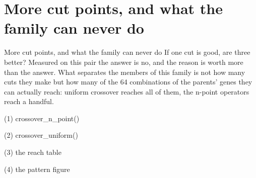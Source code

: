 

\section{More cut points, and what the family can never do}

\begin{frame}{More cut points, and what the family can never do}
If one cut is good, are three better? Measured on this pair the answer is no,
and the reason is worth more than the answer. What separates the members of this
family is not how many cuts they make but how many of the 64 combinations of the
parents' genes they can actually reach: uniform crossover reaches all of them,
the n-point operators reach a handful.
\end{frame}

\begin{frame}[fragile]{(1) crossover\_n\_point()}

\end{frame}

\begin{frame}[fragile]{(2) crossover\_uniform()}

\end{frame}

\begin{frame}[fragile]{(3) the reach table}

\end{frame}

\begin{frame}[fragile]{(4) the pattern figure}

\end{frame}

